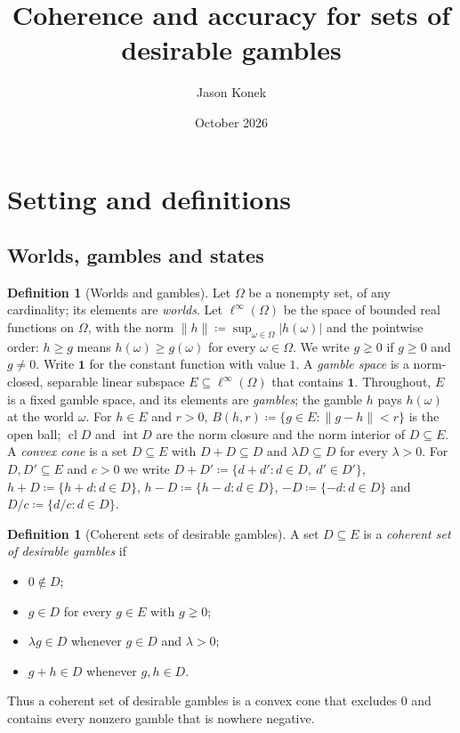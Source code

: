 \documentclass[11pt]{article}
\title{Coherence and accuracy for sets of desirable gambles}
\author{Jason Konek}
\date{October 2026}
\newcommand{\one}{\mathbf{1}}
\DeclareMathOperator{\cl}{cl}
\DeclareMathOperator{\inter}{int}
\theoremstyle{plain}
\theoremstyle{definition}
\newtheorem{definition}[theorem]{Definition}
\begin{document}
\maketitle

\section{Setting and definitions}\label{sec:setting}

\subsection{Worlds, gambles and states}

\begin{definition}[Worlds and gambles]\label{def:gambles}
Let $\Omega$ be a nonempty set, of any cardinality; its elements are \emph{worlds}. Let
$\ell^\infty(\Omega)$ be the space of bounded real functions on $\Omega$, with the norm
$\|h\|\coloneqq\sup_{\omega\in\Omega}|h(\omega)|$ and the pointwise order: $h\ge g$ means
$h(\omega)\ge g(\omega)$ for every $\omega\in\Omega$. We write $g\gneq0$ if $g\ge0$ and $g\ne0$.
Write $\one$ for the constant function
with value $1$. A \emph{gamble space} is a norm-closed, separable linear subspace
$E\subseteq\ell^\infty(\Omega)$ that contains $\one$. Throughout, $E$ is a fixed gamble space,
and its elements are \emph{gambles}; the gamble $h$ pays $h(\omega)$ at the world $\omega$. For
$h\in E$ and $r>0$, $B(h,r)\coloneqq\{g\in E:\|g-h\|<r\}$ is the open ball; $\cl D$ and
$\inter D$ are the norm closure and the norm interior of $D\subseteq E$. A \emph{convex
cone} is a set $D\subseteq E$ with $D+D\subseteq D$ and $\lambda D\subseteq D$ for every
$\lambda>0$. For $D,D'\subseteq E$ and $c>0$ we write $D+D'\coloneqq\{d+d':d\in D,\ d'\in D'\}$,
$h+D\coloneqq\{h+d:d\in D\}$, $h-D\coloneqq\{h-d:d\in D\}$, $-D\coloneqq\{-d:d\in D\}$ and
$D/c\coloneqq\{d/c:d\in D\}$.
\end{definition}

\begin{definition}[Coherent sets of desirable gambles]\label{def:coherentsets}
A set $D\subseteq E$ is a \emph{coherent set of desirable gambles} if
\begin{itemize}
  \item[(D1)] $0\notin D$;
  \item[(D2)] $g\in D$ for every $g\in E$ with $g\gneq0$;
  \item[(D3)] $\lambda g\in D$ whenever $g\in D$ and $\lambda>0$;
  \item[(D4)] $g+h\in D$ whenever $g,h\in D$.
\end{itemize}
Thus a coherent set of desirable gambles is a convex cone that excludes $0$ and contains every
nonzero gamble that is nowhere negative.
\end{definition}
\end{document}
